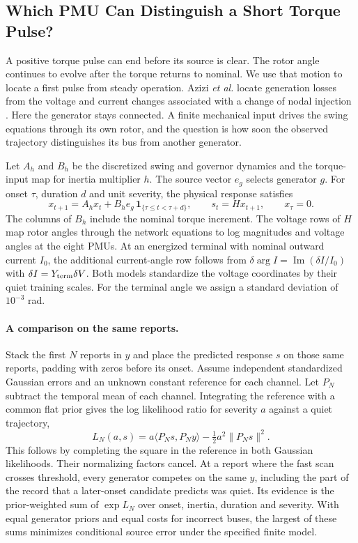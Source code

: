 \subsection{Which PMU Can Distinguish a Short Torque Pulse?}
\label{app:torque-terminal}

A positive torque pulse can end before its source is clear. The rotor
angle continues to evolve after the torque returns to nominal. We use
that motion to locate a first pulse from steady operation. Azizi
\emph{et al.} locate generation losses from the voltage and current
changes associated with a change of nodal injection
\cite{azizi2021log}. Here the generator stays connected. A finite
mechanical input drives the swing equations through its own rotor,
and the question is how soon the observed trajectory distinguishes
its bus from another generator.

Let $A_h$ and $B_h$ be the discretized swing and governor dynamics
and the torque-input map for inertia multiplier $h$. The source
vector $e_g$ selects generator $g$. For onset $\tau$, duration $d$
and unit severity, the physical response satisfies
\[
 x_{t+1}=A_h x_t+B_h e_g\,\mathbf{1}_{\{\tau\le t<\tau+d\}},
 \qquad s_{t}=H x_{t+1},\qquad x_\tau=0 .
\]
The columns of $B_h$ include the nominal torque increment. The
voltage rows of $H$ map rotor angles through the network equations
to log magnitudes and voltage angles at the eight PMUs. At an
energized terminal with nominal outward current $I_0$, the additional
current-angle row follows from
$\delta\arg I=\operatorname{Im}(\delta I/I_0)$ with
$\delta I=Y_{\rm term}\delta V$. Both models standardize the voltage
coordinates by their quiet training scales. For the terminal angle
we assign a standard deviation of $10^{-3}$ rad.

\paragraph{A comparison on the same reports.}
Stack the first $N$ reports in $y$ and place the predicted response
$s$ on those same reports, padding with zeros before its onset.
Assume independent standardized Gaussian errors and an unknown
constant reference for each channel. Let $P_N$ subtract the temporal
mean of each channel. Integrating the reference with a common flat
prior gives the log likelihood ratio for severity $a$ against a
quiet trajectory,
\begin{equation}
 L_N(a,s)=a\langle P_Ns,P_Ny\rangle
              -\tfrac12 a^2\|P_Ns\|^2 .
 \label{eq:pulse-common-prefix}
\end{equation}
This follows by completing the square in the reference in both
Gaussian likelihoods. Their normalizing factors cancel. At a report
where the fast scan crosses threshold, every generator competes on
the same $y$, including the part of the record that a later-onset
candidate predicts was quiet. Its evidence is the prior-weighted
sum of $\exp L_N$ over onset, inertia, duration and severity. With
equal generator priors and equal costs for incorrect buses, the
largest of these sums minimizes conditional source error under the
specified finite model.

